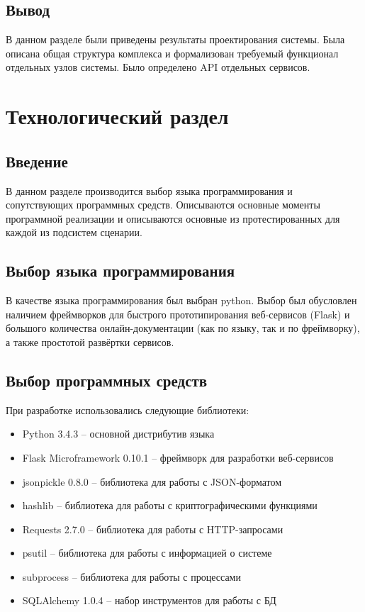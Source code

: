 \documentclass[a4paper,12pt]{report}
\numberwithin{equation}{section}
\begin{document}
  \subsection{Вывод}
  В данном разделе были приведены результаты проектирования системы.
  Была описана общая структура комплекса и формализован требуемый функционал отдельных узлов системы. 
  Было определено API отдельных сервисов.
  
  \clearpage
  \section{Технологический раздел}
  \subsection{Введение}
  В данном разделе производится выбор языка программирования и сопутствующих программных средств. 
  Описываются основные моменты программной реализации и описываются основные из протестированных для каждой из подсистем сценарии.
  
  \subsection{Выбор языка программирования}
  В качестве языка программирования был выбран python. Выбор был обусловлен наличием фреймворков для быстрого прототипирования веб-сервисов (Flask) и большого количества онлайн-документации (как по языку, так и по фреймворку), а также простотой развёртки сервисов.
  
  \subsection{Выбор программных средств}
  При разработке использовались следующие библиотеки:
  \begin{itemize}
    \item Python 3.4.3 \cite{python} -- основной дистрибутив языка
    \item Flask Microframework 0.10.1 \cite{Flask} -- фреймворк для разработки веб-сервисов
    \item jsonpickle 0.8.0 \cite{jsonpickle} -- библиотека для работы с JSON-форматом
    \item hashlib \cite{hashlib} -- библиотека для работы с криптографическими функциями
    \item Requests 2.7.0 \cite{requests} -- библиотека для работы с HTTP-запросами
    \item psutil \cite{psutil} -- библиотека для работы с информацией о системе
    \item subprocess \cite{subprocess} -- библиотека для работы с процессами
    \item SQLAlchemy 1.0.4 \cite{sqlalchemy} -- набор инструментов для работы с БД
  \end{itemize}  
  
\end{document}
